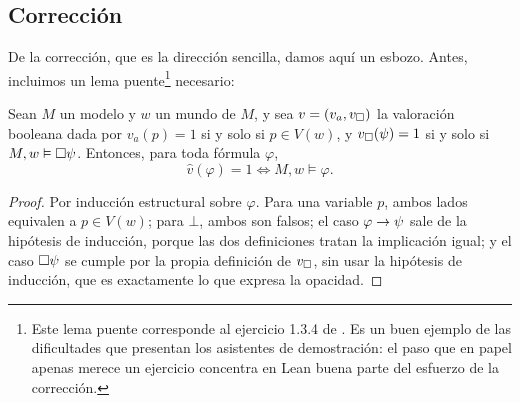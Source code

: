 \subsection*{Corrección}

De la corrección, que es la dirección sencilla, damos aquí un esbozo. Antes, incluimos un lema puente\footnote{Este lema puente corresponde al ejercicio 1.3.4 de \cite{blackburn}. Es un buen ejemplo de las dificultades que presentan los asistentes de demostración: el paso que en papel apenas merece un ejercicio concentra en Lean buena parte del esfuerzo de la corrección.} necesario:

\begin{lema}\label{lem:puente}
Sean $M$ un modelo y $w$ un mundo de $M$, y sea $v = (v_a, v_\square)$ la valoración booleana dada por $v_a(p) = 1$ si y solo si $p \in V(w)$, y $v_\square(\psi) = 1$ si y solo si $M, w \vDash \square\psi$. Entonces, para toda fórmula $\varphi$,
\[
  \hat{v}(\varphi) = 1 \iff M, w \vDash \varphi.
\]
\end{lema}
\begin{proof}
Por inducción estructural sobre $\varphi$. Para una variable $p$, ambos lados equivalen a $p \in V(w)$; para $\bot$, ambos son falsos; el caso $\varphi \to \psi$ sale de la hipótesis de inducción, porque las dos definiciones tratan la implicación igual; y el caso $\square\psi$ se cumple por la propia definición de $v_\square$, sin usar la hipótesis de inducción, que es exactamente lo que expresa la opacidad.
\end{proof}

